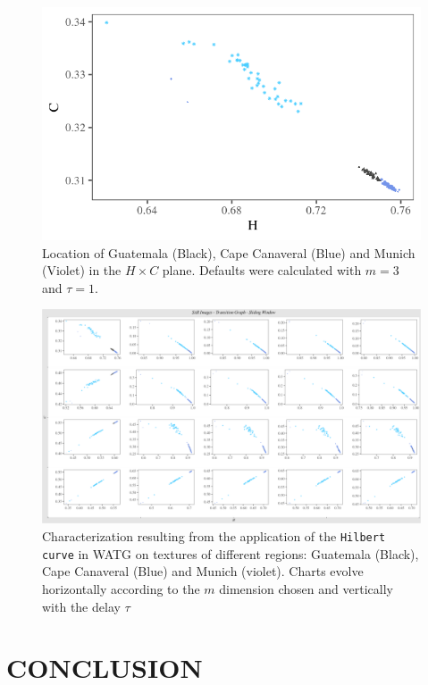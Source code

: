 \documentclass{isprs}
\begin{document}
	\begin{figure}[hbt]
		\centering
		\includegraphics[width=0.9\columnwidth]{Figures/transitionGraphD3t1.png}
		\caption{Location of Guatemala (Black), Cape Canaveral (Blue) and Munich (Violet) in the $H \times C$ plane. Defaults were calculated with $m = 3$ and $\tau = 1$.}
		\label{fig:D3T1}
	\end{figure}
	
	
	\begin{figure}
		\centering
		\includegraphics[width=1.05\textwidth]{Figures/transitionGraphHilbert.pdf}
		\caption{Characterization resulting from the application of the \texttt{Hilbert curve} in WATG on textures of different regions: Guatemala (Black), Cape Canaveral (Blue) and Munich (violet). Charts evolve horizontally according to the $m$ dimension chosen and vertically with the delay $\tau$}
		\label{fig:Regions}
	\end{figure}
	
	
	\section{CONCLUSION}\label{Conclusion}
	
\end{document}
